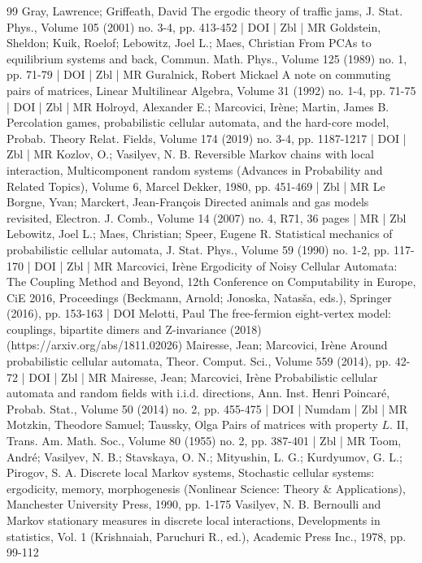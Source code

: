 \documentclass[10pt]{amsart}
\theoremstyle{definition}\newtheorem{defi}[theo]{Definition}\newtheorem{rema}[theo]{Remark}\newtheorem{exam}[theo]{Example}\newtheorem{exem}[theo]{Example}\newtheorem{nota}[theo]{Notation}
\newcounter{a}
\begin{document}
\begin{thebibliography}{99}
Gray, Lawrence; Griffeath, David The ergodic theory of traffic jams, J. Stat. Phys., Volume 105 (2001) no. 3-4, pp. 413-452 | DOI | Zbl | MR
Goldstein, Sheldon; Kuik, Roelof; Lebowitz, Joel L.; Maes, Christian From PCAs to equilibrium systems and back, Commun. Math. Phys., Volume 125 (1989) no. 1, pp. 71-79 | DOI | Zbl | MR
Guralnick, Robert Mickael A note on commuting pairs of matrices, Linear Multilinear Algebra, Volume 31 (1992) no. 1-4, pp. 71-75 | DOI | Zbl | MR
Holroyd, Alexander E.; Marcovici, Irène; Martin, James B. Percolation games, probabilistic cellular automata, and the hard-core model, Probab. Theory Relat. Fields, Volume 174 (2019) no. 3-4, pp. 1187-1217 | DOI | Zbl | MR
Kozlov, O.; Vasilyev, N. B. Reversible Markov chains with local interaction, Multicomponent random systems (Advances in Probability and Related Topics), Volume 6, Marcel Dekker, 1980, pp. 451-469 | Zbl | MR
Le Borgne, Yvan; Marckert, Jean-François Directed animals and gas models revisited, Electron. J. Comb., Volume 14 (2007) no. 4, R71, 36 pages | MR | Zbl
Lebowitz, Joel L.; Maes, Christian; Speer, Eugene R. Statistical mechanics of probabilistic cellular automata, J. Stat. Phys., Volume 59 (1990) no. 1-2, pp. 117-170 | DOI | Zbl | MR
Marcovici, Irène Ergodicity of Noisy Cellular Automata: The Coupling Method and Beyond, 12th Conference on Computability in Europe, CiE 2016, Proceedings (Beckmann, Arnold; Jonoska, Natasša, eds.), Springer (2016), pp. 153-163 | DOI
Melotti, Paul The free-fermion eight-vertex model: couplings, bipartite dimers and Z-invariance (2018) (https://arxiv.org/abs/1811.02026)
Mairesse, Jean; Marcovici, Irène Around probabilistic cellular automata, Theor. Comput. Sci., Volume 559 (2014), pp. 42-72 | DOI | Zbl | MR
Mairesse, Jean; Marcovici, Irène Probabilistic cellular automata and random fields with i.i.d. directions, Ann. Inst. Henri Poincaré, Probab. Stat., Volume 50 (2014) no. 2, pp. 455-475 | DOI | Numdam | Zbl | MR
Motzkin, Theodore Samuel; Taussky, Olga Pairs of matrices with property ${L}$. II, Trans. Am. Math. Soc., Volume 80 (1955) no. 2, pp. 387-401 | Zbl | MR
Toom, André; Vasilyev, N. B.; Stavskaya, O. N.; Mityushin, L. G.; Kurdyumov, G. L.; Pirogov, S. A. Discrete local Markov systems, Stochastic cellular systems: ergodicity, memory, morphogenesis (Nonlinear Science: Theory \& Applications), Manchester University Press, 1990, pp. 1-175
Vasilyev, N. B. Bernoulli and Markov stationary measures in discrete local interactions, Developments in statistics, Vol. 1 (Krishnaiah, Paruchuri R., ed.), Academic Press Inc., 1978, pp. 99-112
\end{thebibliography}
\end{document}
